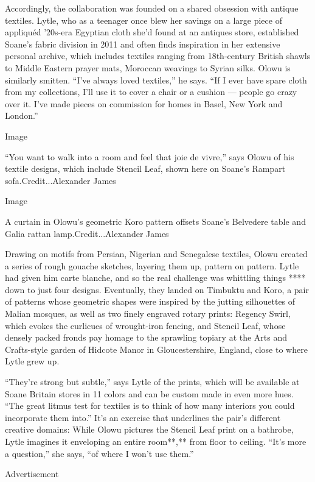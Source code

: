 Accordingly, the collaboration was founded on a shared obsession with
antique textiles. Lytle, who as a teenager once blew her savings on a
large piece of appliquéd '20s-era Egyptian cloth she'd found at an
antiques store, established Soane's fabric division in 2011 and often
finds inspiration in her extensive personal archive, which includes
textiles ranging from 18th-century British shawls to Middle Eastern
prayer mats, Moroccan weavings to Syrian silks. Olowu is similarly
smitten. ``I've always loved textiles,'' he says. ``If I ever have spare
cloth from my collections, I'll use it to cover a chair or a cushion ---
people go crazy over it. I've made pieces on commission for homes in
Basel, New York and London.''

Image

``You want to walk into a room and feel that joie de vivre,'' says Olowu
of his textile designs, which include Stencil Leaf, shown here on
Soane's Rampart sofa.Credit...Alexander James

Image

A curtain in Olowu's geometric Koro pattern offsets Soane's Belvedere
table and Galia rattan lamp.Credit...Alexander James

Drawing on motifs from Persian, Nigerian and Senegalese textiles, Olowu
created a series of rough gouache sketches, layering them up, pattern on
pattern. Lytle had given him carte blanche, and so the real challenge
was whittling things **** down to just four designs. Eventually, they
landed on Timbuktu and Koro, a pair of patterns whose geometric shapes
were inspired by the jutting silhouettes of Malian mosques, as well as
two finely engraved rotary prints: Regency Swirl, which evokes the
curlicues of wrought-iron fencing, and Stencil Leaf, whose densely
packed fronds pay homage to the sprawling topiary at the Arts and
Crafts-style garden of Hidcote Manor in Gloucestershire, England, close
to where Lytle grew up.

``They're strong but subtle,'' says Lytle of the prints, which will be
available at Soane Britain stores in 11 colors and can be custom made in
even more hues. ``The great litmus test for textiles is to think of how
many interiors you could incorporate them into.'' It's an exercise that
underlines the pair's different creative domains: While Olowu pictures
the Stencil Leaf print on a bathrobe, Lytle imagines it enveloping an
entire room**,** from floor to ceiling. ``It's more a question,'' she
says, ``of where I won't use them.''

Advertisement

